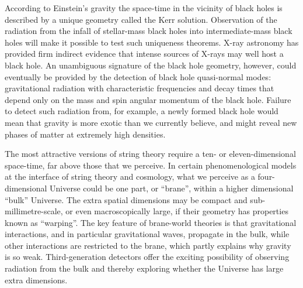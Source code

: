 According to Einstein's gravity the space-time in the vicinity
of black holes is described by a unique geometry called the
Kerr solution. Observation of the radiation from the infall
of stellar-mass black holes into intermediate-mass black holes
will make it possible to test such uniqueness theorems. X-ray
astronomy has provided firm indirect evidence that intense
sources of X-rays may well host a black hole. An unambiguous
signature of the black hole geometry, however, could eventually
be provided by the detection of black hole quasi-normal modes:
gravitational radiation with characteristic frequencies and decay
times that depend only on the mass and spin angular momentum of the black hole.
Failure to detect such radiation from, for example, a newly
formed black hole would mean that gravity is more exotic than
we currently believe,
and might reveal new phases of matter at extremely high densities.

The most attractive versions of string theory require a ten- or
eleven-dimensional space-time, far above those that we perceive.
In certain phenomenological models at the interface of string
theory and cosmology, what we perceive as a four-dimensional
Universe could be one part, or ``brane'', within a higher
dimensional ``bulk'' Universe. The extra spatial dimensions may
be compact and sub-millimetre-scale,
or even macroscopically large, if their geometry has
properties known as ``warping''. The key feature of brane-world
theories is that gravitational interactions, and in particular
gravitational waves, propagate in the bulk, while other interactions
are restricted to the brane, which partly explains why gravity is
so weak. 
Third-generation detectors offer 
the exciting possibility of observing radiation from the bulk and 
thereby exploring whether the Universe has large extra dimensions.



\FloatBarrier
